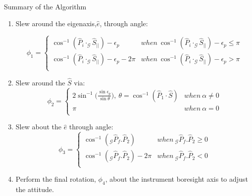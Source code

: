 \documentclass{beamer}
\begin{document}
\begin{frame}
\begin{block}{Summary of the Algorithm}
\begin{enumerate}
\item Slew around the eigenaxis,$\hat{e}$, through angle:

 \begin{equation}\label{phi1}
 \phi_1=\left\{
                \begin{array}{ll}
                 \cos^{-1}(\hat{P}_i\cdot_\mathcal{G}\hat{S}_{||})-\epsilon_p& when\  \cos^{-1}(\hat{P}_i\cdot_\mathcal{G}\hat{S}_{||})-\epsilon_p\leq \pi\\
                 \cos^{-1}(\hat{P}_i\cdot_\mathcal{G}\hat{S}_{||})-\epsilon_p-2\pi& when\ \cos^{-1}(\hat{P}_i\cdot_\mathcal{G}\hat{S}_{||})-\epsilon_p>\pi\\
                \end{array}
              \right.
 \end{equation}
\item Slew around the $\hat{S}$ via:
 \begin{equation}\label{phi2}
 \phi_2=\left\{
                \begin{array}{ll}
                 2\sin^{-1}\Big( \frac{ \sin\epsilon_p}{\sin \theta}\Big),\ \theta=\cos^{-1}(\hat{P}_1\cdot\hat{S})& when\  \alpha\neq 0\\
                 \pi& when\ \alpha=0\\
                \end{array}
              \right.
 \end{equation}
 \item Slew about the $\hat{e}$ through angle:
 \begin{equation}\label{phi3}
 \phi_3=\left\{
                \begin{array}{ll}
                  \cos^{-1}(_\mathcal{G}\hat{P}_f.\hat{P}_2)& when\  _\mathcal{G}\hat{P}_f.\hat{P}_2\geq 0\\
                 \cos^{-1}(_\mathcal{G}\hat{P}_f.\hat{P}_2)-2\pi& when\ _\mathcal{G}\hat{P}_f.\hat{P}_2<0\\
                \end{array}
              \right.
 \end{equation}

\item Perform the final rotation, $\phi_4$, about the instrument boresight axis to adjust the attitude. 
\end{enumerate}
\end{block}
\end{frame}
\end{document}
